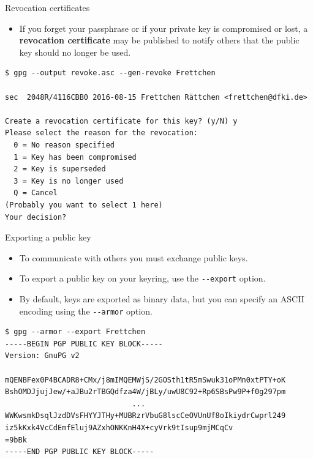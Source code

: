 \documentclass[
mode=present,
paper=smartboard,
size=20pt,
]{powerdot}
\newcommand\vsp{\vspace{-16mm}}
\newcommand{\clopt}[1]{\texttt{{-}#1}}
\begin{document}
\begin{slide}[method=direct]{Revocation certificates}
  \begin{itemize}
  \item If you forget your passphrase or if your private key is
    compromised or lost, a \textbf{revocation certificate} may be
    published to notify others that the public key should no longer be
    used.
  \end{itemize}
\vsp
\begin{verbatim}
$ gpg --output revoke.asc --gen-revoke Frettchen

sec  2048R/4116CBB0 2016-08-15 Frettchen Rättchen <frettchen@dfki.de>

Create a revocation certificate for this key? (y/N) y
Please select the reason for the revocation:
  0 = No reason specified
  1 = Key has been compromised
  2 = Key is superseded
  3 = Key is no longer used
  Q = Cancel
(Probably you want to select 1 here)
Your decision? 
\end{verbatim}
\end{slide}

\begin{slide}[method=direct]{Exporting a public key}
  \begin{itemize}
  \item To communicate with others you must exchange public keys.
  \item To export a public key on your keyring, use the
    \clopt{-export} option.
  \item By default, keys are exported as binary data, but you can
    specify an ASCII encoding using the \clopt{-armor} option.
  \end{itemize}
\vsp
\begin{verbatim}
$ gpg --armor --export Frettchen
-----BEGIN PGP PUBLIC KEY BLOCK-----
Version: GnuPG v2

mQENBFex0P4BCADR8+CMx/j8mIMQEMWjS/2GOSth1tR5mSwuk31oPMn0xtPTY+oK
BshOMDJjujJew/+aJBu2rTBGQdfza4W/jBLy/uwU8C92+Rp6SBsPw9P+f0g297pm
                             ...
WWKwsmkDsqlJzdDVsFHYYJTHy+MUBRzrVbuG8lscCeOVUnUf8oIkiydrCwprl249
iz5kKxk4VcCdEmfEluj9AZxhONKKnH4X+cyVrk9tIsup9mjMCqCv
=9bBk
-----END PGP PUBLIC KEY BLOCK-----
\end{verbatim}
\end{slide}
\end{document}
